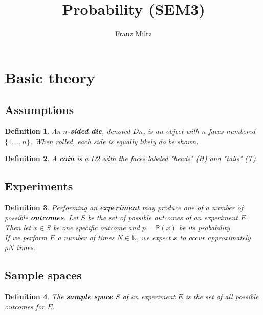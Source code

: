\documentclass{article}
\theoremstyle{sltheorem}
\newtheorem{definition}{Definition}[section]
\newcommand{\N}{\mathbb{N}}
\renewcommand{\P}{\mathbb{P}}
\newcommand*\B[1]{\textbf{#1}}
\begin{document}
\title{Probability (SEM3)}
\author{Franz Miltz}
\maketitle
\tableofcontents
\pagebreak
\section{Basic theory}
\subsection{Assumptions}
\begin{definition}
    An \B{$n$-sided die}, denoted $Dn$, is an object with $n$ faces numbered $\{1,..,n\}$.
    When rolled, each side is equally likely do be shown.
\end{definition}
\begin{definition}
    A \B{coin} is a $D2$ with the faces labeled "heads" (H) and "tails" (T).
\end{definition}
\subsection{Experiments}
\begin{definition}
    Performing an \B{experiment} may produce one of a number of possible \B{outcomes}.
    Let $S$ be the set of possible outcomes of an experiment $E$. Then let $x\in S$ be one specific outcome and
    $p=\P(x)$ be its probability.\\
    If we perform $E$ a number of times $N\in\N$, we expect $x$ to occur approximately $pN$ times.
\end{definition}
\subsection{Sample spaces}
\begin{definition}
    The \textbf{sample space $S$} of an experiment $E$ is the set of all possible outcomes for $E$.
\end{definition}
\end{document}

